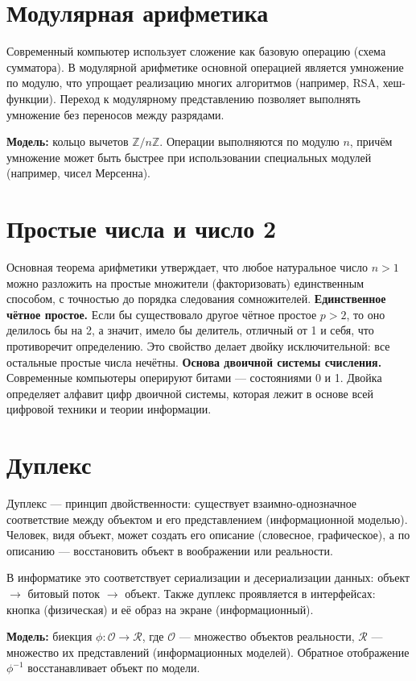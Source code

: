 \documentclass[areasetadvanced]{scrartcl}
\begin{document}
        \section{Модулярная арифметика}
                Современный компьютер использует сложение как базовую операцию (схема сумматора). 
                В модулярной арифметике основной операцией является умножение по модулю, 
                что упрощает реализацию многих алгоритмов (например, RSA, хеш-функции). 
                Переход к модулярному представлению позволяет выполнять умножение без переносов между разрядами.

                \textbf{Модель:} кольцо вычетов $\mathbb{Z}/n\mathbb{Z}$. 
                Операции выполняются по модулю $n$, причём умножение может быть быстрее при использовании специальных модулей 
                (например, чисел Мерсенна).
        \section{Простые числа и число 2}
                    Основная теорема арифметики утверждает, что любое натуральное число $n > 1$ можно разложить на простые множители (факторизовать) единственным способом, с точностью до порядка следования сомножителей.
                    \textbf{Единственное чётное простое.} Если бы существовало другое чётное простое $p>2$, то оно делилось бы на 2, а значит, имело бы делитель, отличный от 1 и себя, что противоречит определению. Это свойство делает двойку исключительной: все остальные простые числа нечётны.
                    \textbf{Основа двоичной системы счисления.} Современные компьютеры оперируют битами — состояниями 0 и 1. Двойка определяет алфавит цифр двоичной системы, которая лежит в основе всей цифровой техники и теории информации.
        \section{Дуплекс}
                Дуплекс — принцип двойственности: существует взаимно-однозначное соответствие между объектом и его представлением (информационной моделью). 
                Человек, видя объект, может создать его описание (словесное, графическое), а по описанию — восстановить объект в воображении или реальности.

                В информатике это соответствует сериализации и десериализации данных: объект $\to$ битовый поток $\to$ объект. 
                Также дуплекс проявляется в интерфейсах: кнопка (физическая) и её образ на экране (информационный).

                \textbf{Модель:} биекция $\phi: \mathcal{O} \to \mathcal{R}$, где $\mathcal{O}$ — множество объектов реальности, 
                $\mathcal{R}$ — множество их представлений (информационных моделей). 
                Обратное отображение $\phi^{-1}$ восстанавливает объект по модели.
\end{document}
